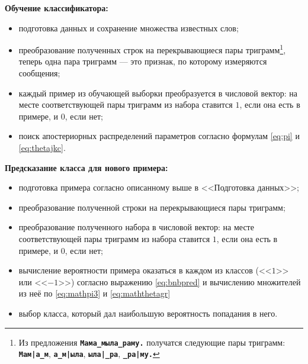 \textbf{Обучение классификатора:}
\begin{itemize}
  \setlength{\itemsep}{1pt}%
    \setlength{\parskip}{1pt}
\item подготовка данных и сохранение множества известных слов;
\item преобразование полученных строк на перекрывающиеся пары триграмм\footnote{Из предложения
    \texttt{\textbf{Мама\_мыла\_раму.}} получатся следующие пары триграмм: \texttt{\textbf{Мам|а\_м}},
    \texttt{\textbf{а\_м|ыла}}, \texttt{\textbf{ыла|\_ра}}, \texttt{\textbf{\_ра|му.}}}, теперь одна пара триграмм --- это признак, по которому измеряются сообщения;
\item каждый пример из обучающей выборки преобразуется в числовой вектор: на месте соответствующей
  пары триграмм из набора ставится $1$, если она есть в примере, и $0$, если нет;
\item поиск апостериорных распределений параметров согласно формулам \ref{eq:pi} и \ref{eq:thetajkc}.
\end{itemize}

\begin{samepage}
  \textbf{Предсказание класса для нового примера:}
  \begin{itemize}
    \setlength{\itemsep}{1pt}%
    \setlength{\parskip}{1pt}
  \item подготовка примера согласно описанному выше в <<Подготовка данных>>;
  \item преобразование полученной строки на перекрывающиеся пары триграмм;
  \item преобразование полученного набора в числовой вектор: на месте соответствующей
    пары триграмм из набора ставится $1$, если она есть в примере, и $0$, если нет;
  \item вычисление вероятности примера оказаться в каждом из классов (<<$1$>> или <<$-1$>>) согласно выражению
    \ref{eq:bnbpred} и вычислению множителей из неё по \ref{eq:mathpi3} и \ref{eq:maththetagr}
  \item выбор класса, который дал наибольшую вероятность попадания в него.
  \end{itemize}
\end{samepage}
